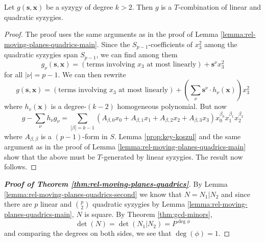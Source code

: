 \documentclass[fleqn,reqno]{amsart}
\begin{document}
\begin{lemma}
	\label{lemma:rel-moving-planes-quadrics-second}
	Let $g(\mathbf s, \mathbf x)$ be a syzygy of degree $k>2$.
	Then $g$ is a $T$-combination of linear and quadratic syzygies.
\end{lemma}

\begin{proof}
	The proof uses the same arguments as in the proof of Lemma \ref{lemma:rel-moving-planes-quadrics-main}.
	Since the $S_{p-1}$-coefficients of $x_3^2$ among the quadratic syzygies span $S_{p-1}$,
	we can find among them
	\[
		g_\nu(\mathbf s,\mathbf x)=(\text{terms involving $x_3$ at most linearly})+{\mathbf s}^\nu x_3^2
	\]
	for all $|\nu|=p-1$. We can then rewrite
	\[
		g(\mathbf s,\mathbf x)=(\text{terms involving $x_3$ at most linearly})+(\sum_\nu {\mathbf s}^\nu\cdot h_\nu(\mathbf x))x_3^2
	\]
	where $h_v(\mathbf x)$ is a degree-$(k-2)$ homogeneous polynomial. But now
	\[
		g-\sum_\nu h_\nu g_\nu=\sum_{|\beta|=k-1} (A_{\beta,0}x_0+A_{\beta,1}x_1+A_{\beta,2}x_2+A_{\beta,3}x_3) x_0^{\beta_0}x_1^{\beta_1}x_2^{\beta_2}
	\]
	where $A_{\beta,\beta}$ is a $(p-1)$-form in $S$.
	Lemma \ref{prop:key-koszul} and the same argument as in the proof of Lemma \ref{lemma:rel-moving-planes-quadrics-main}
	show that the above must be $T$-generated by linear syzygies.
	The result now follows.
\end{proof}

\begin{proof}[\bf Proof of Theorem \ref{thm:rel-moving-planes-quadrics}]
	By Lemma \ref{lemma:rel-moving-planes-quadrics-second} we know that $N=N_1|N_2$
	and since there are $p$ linear and $\binom{p}{2}$ quadratic syzygies
	by Lemma \ref{lemma:rel-moving-planes-quadrics-main}, $N$ is square.
	By Theorem \ref{thm:gcd-minors},
	\[
		\det(N)=\det(N_1|N_2)=P^{\deg\phi}
	\]
	and comparing the degrees on both sides, we see that $\deg(\phi)=1$.
\end{proof}




\end{document}
